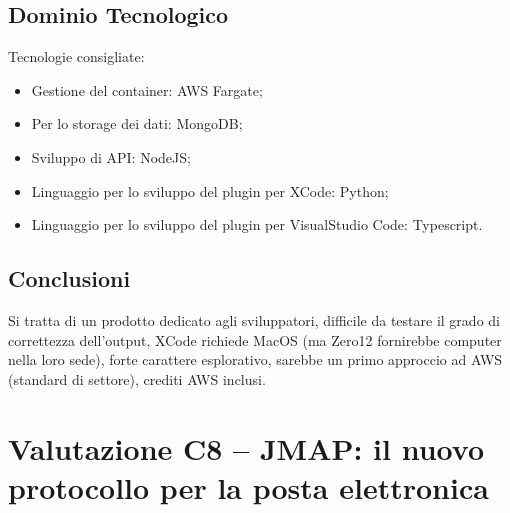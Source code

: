 \documentclass[a4paper, twoside]{article}
\begin{document}
    \subsection{Dominio Tecnologico}
    Tecnologie consigliate:
        \begin{itemize}
            \item Gestione del container: AWS Fargate;
            \item Per lo storage dei dati: MongoDB;
            \item Sviluppo di API: NodeJS;
            \item Linguaggio per lo sviluppo del plugin per XCode: Python;
            \item Linguaggio per lo sviluppo del plugin per VisualStudio Code: Typescript.
        \end{itemize}
    \subsection{Conclusioni}
    Si tratta di un prodotto dedicato agli sviluppatori, difficile da testare il grado di correttezza dell'output, XCode richiede MacOS (ma Zero12 fornirebbe computer nella loro sede), forte carattere esplorativo, sarebbe un primo approccio ad AWS (standard di settore), crediti AWS inclusi.

\section{Valutazione C8 -- JMAP: il nuovo protocollo per la posta elettronica}
\end{document}
